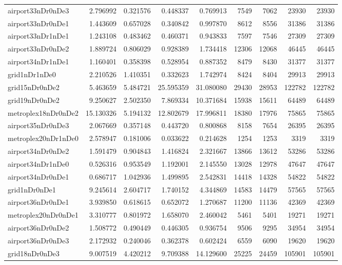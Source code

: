 \begin{longtable}{|l|r|r|r|r|r|r|r|r|}
airport33nDr0nDe3 & 2.796992 & 0.321576 & 0.448337 & 0.769913 & 7549 & 7062 & 23930 & 23930 \\
airport33nDr0nDe1 & 1.443609 & 0.657028 & 0.340842 & 0.997870 & 8612 & 8556 & 31386 & 31386 \\
airport33nDr1nDe1 & 1.243108 & 0.483462 & 0.460371 & 0.943833 & 7597 & 7546 & 27309 & 27309 \\
airport33nDr0nDe2 & 1.889724 & 0.806029 & 0.928389 & 1.734418 & 12306 & 12068 & 46445 & 46445 \\
airport34nDr1nDe1 & 1.160401 & 0.358398 & 0.528954 & 0.887352 & 8479 & 8430 & 31377 & 31377 \\
grid1nDr1nDe0 & 2.210526 & 1.410351 & 0.332623 & 1.742974 & 8424 & 8404 & 29913 & 29913 \\
grid15nDr0nDe2 & 5.463659 & 5.484721 & 25.595359 & 31.080080 & 29430 & 28953 & 122782 & 122782 \\
grid19nDr0nDe2 & 9.250627 & 2.502350 & 7.869334 & 10.371684 & 15938 & 15611 & 64489 & 64489 \\
metroplex18nDr0nDe2 & 15.130326 & 5.194132 & 12.802679 & 17.996811 & 18380 & 17976 & 75865 & 75865 \\
airport35nDr0nDe3 & 2.067669 & 0.357148 & 0.443720 & 0.800868 & 8158 & 7654 & 26395 & 26395 \\
metroplex20nDr1nDe0 & 2.578947 & 0.181006 & 0.033622 & 0.214628 & 1254 & 1253 & 3319 & 3319 \\
airport34nDr0nDe2 & 1.591479 & 0.904843 & 1.416824 & 2.321667 & 13866 & 13612 & 53286 & 53286 \\
airport34nDr1nDe0 & 0.526316 & 0.953549 & 1.192001 & 2.145550 & 13028 & 12978 & 47647 & 47647 \\
airport34nDr0nDe1 & 0.686717 & 1.042936 & 1.499895 & 2.542831 & 14418 & 14328 & 54822 & 54822 \\
grid1nDr0nDe1 & 9.245614 & 2.604717 & 1.740152 & 4.344869 & 14583 & 14479 & 57565 & 57565 \\
airport36nDr0nDe1 & 3.939850 & 0.618615 & 0.652072 & 1.270687 & 11200 & 11136 & 42369 & 42369 \\
metroplex20nDr0nDe1 & 3.310777 & 0.801972 & 1.658070 & 2.460042 & 5461 & 5401 & 19271 & 19271 \\
airport36nDr0nDe2 & 1.508772 & 0.490449 & 0.446305 & 0.936754 & 9506 & 9295 & 34954 & 34954 \\
airport36nDr0nDe3 & 2.172932 & 0.240046 & 0.362378 & 0.602424 & 6559 & 6090 & 19620 & 19620 \\
grid18nDr0nDe3 & 9.007519 & 4.420212 & 9.709388 & 14.129600 & 25225 & 24459 & 105901 & 105901 \\

\end{longtable}
